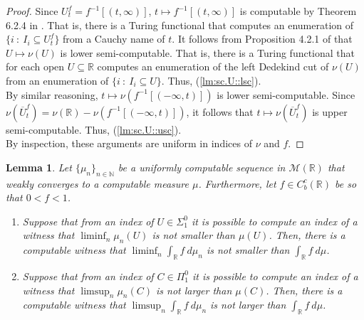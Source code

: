 \documentclass{amsart}
\newcommand{\R}{\mathbb{R}}
\newcommand{\N}{\mathbb{N}}
\newcommand{\M}{\mathcal{M}}
\newcommand{\ol}{\overline}
\newtheorem{lemma}[theorem]{Lemma}
\theoremstyle{definition}
\numberwithin{equation}{section}
\begin{document}
\begin{proof}
Since $U^f_t = f^{-1}[(t,\infty)]$, $t \mapsto f^{-1}[(t,\infty)]$ is computable by Theorem 6.2.4 in \cite{Weihrauch.2000}.  That is, there is a Turing functional that computes an enumeration of $\{i\ :\ I_i \subseteq U^f_t\}$ from 
a Cauchy name of $t$.  It follows from Proposition 4.2.1 of \cite{HR09b} that $U \mapsto \nu(U)$ is lower semi-computable.  
That is, there is a Turing functional that for each open $U \subseteq \R$ computes an enumeration of the left Dedekind cut of $\nu(U)$ from an enumeration of $\{i\ :\ I_i \subseteq U\}$.  Thus, (\ref{lm:sc.U::lsc}).\\

By similar reasoning, $t \mapsto \nu (f^{-1}[(-\infty, t)])$ is lower semi-computable.  Since 
$\nu(\ol{U}_t^f) = \nu(\R) - \nu(f^{-1}[(-\infty,t)])$, it follows that $t\mapsto \nu(\ol{U}^f_t)$ is upper semi-computable.  Thus, (\ref{lm:sc.U::usc}).\\

By inspection, these arguments are uniform in indices of $\nu$ and $f$.
\end{proof}

\begin{lemma}\label{lm:mod.int}
Let $\{\mu_n\}_{n\in\N}$ be a uniformly computable sequence in $\M(\R)$ that weakly converges to a computable measure $\mu$.  Furthermore, let $f\in C_b^c(\R)$ be so that $0<f<1$.
\begin{enumerate}
	\item Suppose that from an index of $U \in \Sigma^0_1$ it is possible to compute an index of a witness that 
	$\liminf_n \mu_n(U)$ is not smaller than $\mu(U)$.  Then, there is a computable witness that 
	$\liminf_n \int_\R f\ d\mu_n$ is not smaller than $\int_\R f\ d\mu$.
	\label{lm:mod.int::lower}
	
	\item Suppose that from an index of $C \in \Pi^0_1$ it is possible to compute an index of a witness that 
	$\limsup_n \mu_n(C)$ is not larger than $\mu(C)$.  Then, there is a computable witness that 
	$\limsup_n \int_\R f\ d\mu_n$ is not larger than $\int_\R f\ d\mu$.
	\label{lm:mod.int::upper}
\end{enumerate}
\end{lemma}
\end{document}
